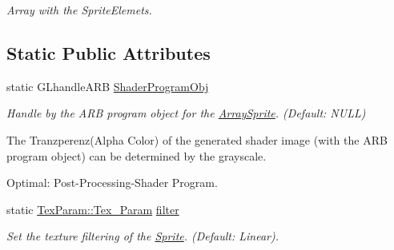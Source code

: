 \begin{DoxyCompactItemize}
\begin{DoxyCompactList}\small\item\em Array with the SpriteElemets. \item\end{DoxyCompactList}\end{DoxyCompactItemize}
\subsection*{Static Public Attributes}
\begin{DoxyCompactItemize}
\item 
\hypertarget{class_f2_c_1_1_array_sprite_ab8832ebf9d9d32ddb93801322b4d70b5}{
static GLhandleARB \hyperlink{class_f2_c_1_1_array_sprite_ab8832ebf9d9d32ddb93801322b4d70b5}{ShaderProgramObj}}
\label{class_f2_c_1_1_array_sprite_ab8832ebf9d9d32ddb93801322b4d70b5}

\begin{DoxyCompactList}\small\item\em Handle by the ARB program object for the \hyperlink{class_f2_c_1_1_array_sprite}{ArraySprite}. (Default: NULL) \par
 The Tranzperenz(Alpha Color) of the generated shader image (with the ARB program object) can be determined by the grayscale. \par
 Optimal: Post-\/Processing-\/Shader Program. \item\end{DoxyCompactList}\item 
\hypertarget{class_f2_c_1_1_array_sprite_a75dbddbac91e1fc643007d165a302ef5}{
static \hyperlink{namespace_f2_c_1_1_tex_param_a64299c3972944468af4e8b0394c936c6}{TexParam::Tex\_\-Param} \hyperlink{class_f2_c_1_1_array_sprite_a75dbddbac91e1fc643007d165a302ef5}{filter}}
\label{class_f2_c_1_1_array_sprite_a75dbddbac91e1fc643007d165a302ef5}

\begin{DoxyCompactList}\small\item\em Set the texture filtering of the \hyperlink{class_f2_c_1_1_sprite}{Sprite}. (Default: Linear). \item\end{DoxyCompactList}\end{DoxyCompactItemize}
